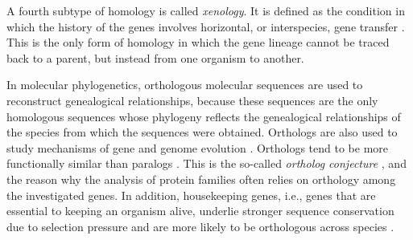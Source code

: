 A fourth subtype of homology is called \emph{xenology}. It is defined as the
condition in which the history of the genes involves horizontal, or
interspecies, gene transfer \citep{gray1983}. This is the only form of homology
in which the gene lineage cannot be traced back to a parent, but instead from
one organism to another.

In molecular phylogenetics, orthologous molecular sequences are used to
reconstruct genealogical relationships, because these sequences are the only
homologous sequences whose phylogeny reflects the genealogical relationships of
the species from which the sequences were obtained. Orthologs are also used to
study mechanisms of gene and genome evolution \citep{dessimoz2012}. Orthologs
tend to be more functionally similar than paralogs \citep{altenhoff2012}. This
is the so-called \emph{ortholog conjecture} \citep{tatusov1997}, and the reason
why the analysis of protein families often relies on orthology among the
investigated genes. In addition, housekeeping genes, i.e., genes that are
essential to keeping an organism alive, underlie stronger sequence conservation
due to selection pressure \citep{she2009} and are more likely to be orthologous
across species \citep{waterhouse2011}. 
